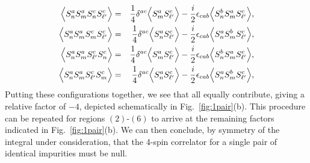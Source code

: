 \documentclass[aps,prb,twocolumn,superscriptaddress]{revtex4-1}
\begin{document}
\begin{eqnarray}
\Bigl\langle{S^{a}_{n}S^{a}_{m}S^{c}_{n}S^{c}_{\ell'}\Bigr\rangle}&=&\frac{1}{4}\delta^{ac}\Bigl\langle{S^{a}_{m}S^{c}_{\ell'}\Bigr\rangle}-\frac{i}{2}\epsilon_{cab}\Bigl\langle{S^{b}_{n}S^{a}_{m}S^{c}_{\ell'}\Bigr\rangle}, \nonumber \\ 
\Bigl\langle{S^{a}_{n}S^{a}_{m}S^{c}_{m}S^{c}_{\ell'}\Bigr\rangle}&=&\frac{1}{4}\delta^{ac}\Bigl\langle{S^{a}_{n}S^{c}_{\ell'}\Bigr\rangle}-\frac{i}{2}\epsilon_{cab}\Bigl\langle{S^{a}_{n}S^{b}_{m}S^{c}_{\ell'}\Bigr\rangle}, \nonumber \\ 
\Bigl\langle{S^{a}_{n}S^{a}_{m}S^{c}_{\ell'}S^{c}_{n}\Bigr\rangle}&=&\frac{1}{4}\delta^{ac}\Bigl\langle{S^{a}_{m}S^{c}_{\ell'}\Bigr\rangle}-\frac{i}{2}\epsilon_{cab}\Bigl\langle{S^{b}_{n}S^{a}_{m}S^{c}_{\ell'}\Bigr\rangle}, \nonumber \\ 
\Bigl\langle{S^{a}_{n}S^{a}_{m}S^{c}_{\ell'}S^{c}_{m}\Bigr\rangle}&=&\frac{1}{4}\delta^{ac}\Bigl\langle{S^{a}_{n}S^{c}_{\ell'}\Bigr\rangle}-\frac{i}{2}\epsilon_{cab}\Bigl\langle{S^{a}_{n}S^{b}_{m}S^{c}_{\ell'}\Bigr\rangle}, \nonumber \\ \label{eqn:2orderM_2aa}
\end{eqnarray}
Putting these configurations together, we see that all equally contribute, giving a relative factor of $-4$, depicted schematically in Fig.~\ref{fig:1pair}(b). This procedure can be repeated for regions $(2)$-$(6)$ to arrive at the remaining factors indicated in Fig.~\ref{fig:1pair}(b). We can then conclude, by symmetry of the integral under consideration, that the 4-spin correlator for a single pair of identical impurities must be null. 
\end{document}
